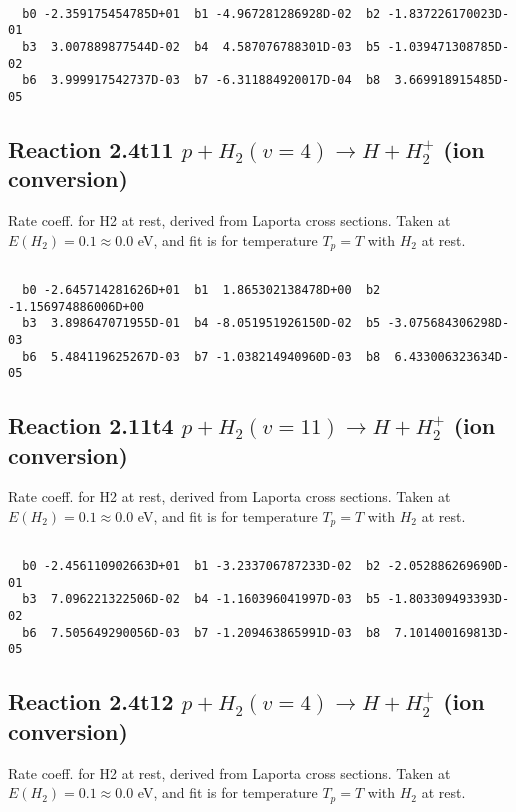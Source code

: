 \begin{small}\begin{verbatim}

  b0 -2.359175454785D+01  b1 -4.967281286928D-02  b2 -1.837226170023D-01
  b3  3.007889877544D-02  b4  4.587076788301D-03  b5 -1.039471308785D-02
  b6  3.999917542737D-03  b7 -6.311884920017D-04  b8  3.669918915485D-05

\end{verbatim}\end{small}

\newpage
\subsection{
Reaction 2.4t11
$ p + H_2(v=4) \rightarrow H + H_2^+$ (ion conversion)
}
Rate coeff. for H2 at rest, derived from Laporta cross sections.
Taken at $E(H_2) = 0.1 \approx 0.0$ eV,  and fit is for temperature $T_p=T$ with $H_2$ at rest.

\begin{small}\begin{verbatim}

  b0 -2.645714281626D+01  b1  1.865302138478D+00  b2 -1.156974886006D+00
  b3  3.898647071955D-01  b4 -8.051951926150D-02  b5 -3.075684306298D-03
  b6  5.484119625267D-03  b7 -1.038214940960D-03  b8  6.433006323634D-05

\end{verbatim}\end{small}

\newpage
\subsection{
Reaction 2.11t4
$ p + H_2(v=11) \rightarrow H + H_2^+$ (ion conversion)
}
Rate coeff. for H2 at rest, derived from Laporta cross sections.
Taken at $E(H_2) = 0.1 \approx 0.0$ eV,  and fit is for temperature $T_p=T$ with $H_2$ at rest.

\begin{small}\begin{verbatim}

  b0 -2.456110902663D+01  b1 -3.233706787233D-02  b2 -2.052886269690D-01
  b3  7.096221322506D-02  b4 -1.160396041997D-03  b5 -1.803309493393D-02
  b6  7.505649290056D-03  b7 -1.209463865991D-03  b8  7.101400169813D-05

\end{verbatim}\end{small}

\newpage
\subsection{
Reaction 2.4t12
$ p + H_2(v=4) \rightarrow H + H_2^+$ (ion conversion)
}
Rate coeff. for H2 at rest, derived from Laporta cross sections.
Taken at $E(H_2) = 0.1 \approx 0.0$ eV,  and fit is for temperature $T_p=T$ with $H_2$ at rest.


